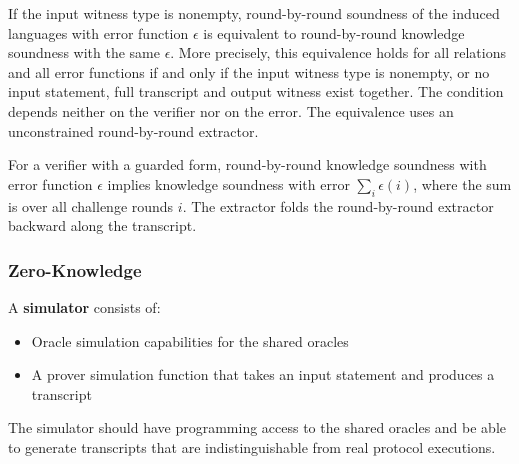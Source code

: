 \begin{theorem}
    \label{thm:rbr_soundness_iff_rbr_knowledge_soundness}
    If the input witness type is nonempty, round-by-round soundness of the induced languages with
    error function \(\epsilon\) is equivalent to round-by-round knowledge soundness with the same
    \(\epsilon\). More precisely, this equivalence holds for all relations and all error functions
    if and only if the input witness type is nonempty, or no input statement, full transcript and
    output witness exist together. The condition depends neither on the verifier nor on the error.
    The equivalence uses an unconstrained round-by-round extractor.
    \leanok
\end{theorem}

\begin{theorem}
    \label{thm:rbr_knowledge_soundness_implies_knowledge_soundness}
    For a verifier with a guarded form, round-by-round knowledge soundness with error function
    \(\epsilon\) implies knowledge soundness with error \(\sum_i \epsilon(i)\), where the sum is over
    all challenge rounds \(i\). The extractor folds the round-by-round extractor backward along the
    transcript.
    \leanok
\end{theorem}

\subsubsection{Zero-Knowledge}

\begin{definition}[Simulator]
    \label{def:simulator}
    A \textbf{simulator} consists of:
    \begin{itemize}
        \item Oracle simulation capabilities for the shared oracles
        \item A prover simulation function that takes an input statement and produces a transcript
    \end{itemize}
    The simulator should have programming access to the shared oracles and be able to generate
    transcripts that are indistinguishable from real protocol executions.
    \leanok
\end{definition}

